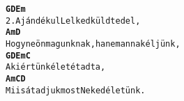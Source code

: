 \newpage
{}
\kottastart
{}
\kottaend
\begin{minipage}{\textwidth}
\begin{alltt}
\textbf{   G          D             Em}
2. Ajándékul Lelked küldted el,
\textbf{           Am                       D}
   Hogy ne önmagunknak, hanem annak éljünk,
\textbf{   G          D         Em  C}
   Aki értünk életét adta,
\textbf{         Am            C        D}
   Mi is átadjuk most Neked életünk.
\end{alltt}
\vspace{0.0cm}
\versszakspacing
\end{minipage}
